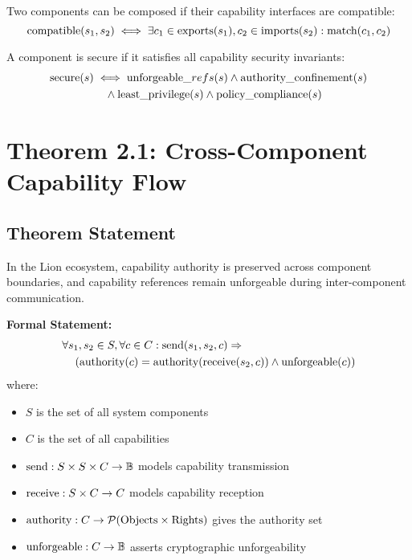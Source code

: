 \begin{definition}
Two components can be composed if their capability interfaces are compatible:
\begin{equation}
\text{compatible}(s_1, s_2) \iff \exists c_1 \in \text{exports}(s_1), c_2 \in \text{imports}(s_2) : \text{match}(c_1, c_2)
\end{equation}
\end{definition}

\begin{definition}
A component is secure if it satisfies all capability security invariants:
\begin{align}
\text{secure}(s) &\iff \text{unforgeable}\_refs(s) \land \text{authority\_confinement}(s) \nonumber \\
&\quad \land \text{least\_privilege}(s) \land \text{policy\_compliance}(s)
\end{align}
\end{definition}

\newpage

\section{Theorem 2.1: Cross-Component Capability Flow}

\subsection{Theorem Statement}

\begin{theorem}
In the Lion ecosystem, capability authority is preserved across component boundaries, and capability references remain unforgeable during inter-component communication.

\textbf{Formal Statement:}
\begin{align}
&\forall s_1, s_2 \in S, \forall c \in C : \text{send}(s_1, s_2, c) \Rightarrow \nonumber \\
&\quad \left(\text{authority}(c) = \text{authority}(\text{receive}(s_2, c)) \land \text{unforgeable}(c)\right)
\end{align}
where:
\begin{itemize}
\item $S$ is the set of all system components
\item $C$ is the set of all capabilities
\item $\text{send}: S \times S \times C \to \mathbb{B}$ models capability transmission
\item $\text{receive}: S \times C \to C$ models capability reception
\item $\text{authority}: C \to \mathcal{P}(\text{Objects} \times \text{Rights})$ gives the authority set
\item $\text{unforgeable}: C \to \mathbb{B}$ asserts cryptographic unforgeability
\end{itemize}
\end{theorem}

